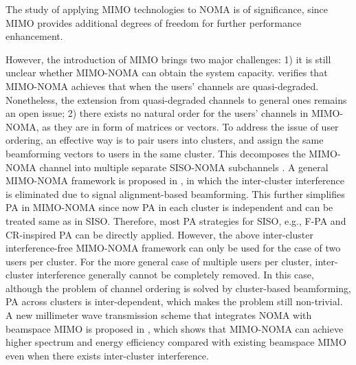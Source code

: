 \documentclass[10pt,final,journal,a4paper,twoside,twocolumn,romanappendices]{IEEEtran}
\theoremstyle{myremark}
\theoremstyle{myremark}
\begin{document}


The study of applying MIMO technologies to NOMA is of significance, since MIMO provides
additional degrees of freedom for further performance enhancement. {\color{black}However, the introduction of MIMO brings two major challenges: 1) it is still unclear whether MIMO-NOMA can obtain the system capacity. \cite{24} verifies that MIMO-NOMA achieves that when the users' channels are quasi-degraded. Nonetheless, the extension from quasi-degraded channels to general ones remains an open issue; 2) there exists no natural order for the users' channels in MIMO-NOMA, as they are in form of matrices or vectors. To address the issue of user ordering, an effective way is to pair users into clusters, and assign the same beamforming vectors to users in the same cluster. This decomposes the MIMO-NOMA channel into multiple separate SISO-NOMA subchannels \cite{8, capacity_zeng, 33}. A general MIMO-NOMA framework is proposed in \cite{8}, in which the inter-cluster interference is eliminated due to signal alignment-based beamforming. This further simplifies PA in MIMO-NOMA since now PA in each cluster is independent and can be treated same as in SISO. Therefore, most PA strategies for SISO, e.g., F-PA and CR-inspired PA can be directly applied. However, the above inter-cluster interference-free MIMO-NOMA framework can only be used for the case of two users per cluster. For the more general case of multiple users per cluster, inter-cluster interference generally cannot be completely removed. In this case, although the problem of channel ordering is solved by cluster-based beamforming, PA across clusters is inter-dependent, which makes the problem still non-trivial. {\color{black}A new millimeter wave transmission scheme that integrates NOMA with beamspace MIMO is proposed in \cite{33}, which shows that MIMO-NOMA can achieve higher spectrum and energy efficiency compared with existing beamspace MIMO even when there exists inter-cluster interference.}

}
\end{document}
